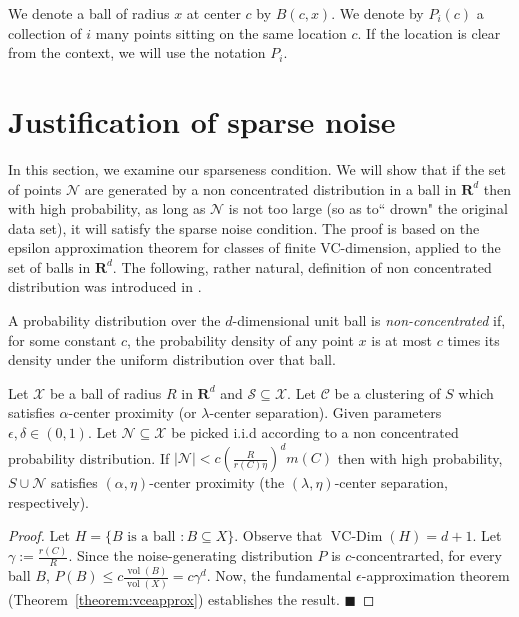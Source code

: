 \documentclass[orivec]{llncs}
\newcommand{\mc}{\mathcal}
\newcommand{\mb}{\mathbf}
\DeclareMathOperator{\vcdim}{VC-Dim}
\DeclareMathOperator{\vol}{vol}
\renewcommand{\qed}{\hfill\ensuremath{\blacksquare}}
\begin{document}
We denote a ball of radius $x$ at center $c$ by $B(c, x)$. We denote by $P_{i}(c)$ a collection of $i$ many points sitting on the same location $c$. If the location is clear from the context, we will use the notation $P_i$.



\section{Justification of sparse noise}
\label{Noise_justify}
In this section, we examine our sparseness condition. We will show that if the set of points $\mc N$ are generated by a non concentrated distribution in a ball in $\mb R^d$ then with high probability, as long as $\mc N$ is not too large (so as to``
drown" the original data set), it will satisfy the sparse noise condition. The proof is based on the epsilon approximation theorem for classes of finite VC-dimension, applied to the set of balls in $\mb R^d$. The following, rather natural, definition of non concentrated distribution was introduced in \cite{balcan2012distributed}.
\begin{definition} 
A probability distribution over the $d$-dimensional unit ball is \emph{non-concentrated} if, for some constant $c$, the probability density of any point $x$ is at most $c$ times its density under the uniform distribution over that ball.
\end{definition}

\begin{theorem}
\label{theorem:sparse}
Let $\mc X$ be a ball of radius $R$ in $\mb R^d$ and $\mc S \subseteq \mc X$. Let $\mc C$ be a clustering of $S$ which satisfies $\alpha$-center proximity (or $\lambda$-center separation). Given parameters $\epsilon, \delta \in (0,1)$. Let $\mc N \subseteq \mc X$ be picked i.i.d according to a non concentrated probability distribution. If $|\mc N| < c  \left( \frac{R}{r(C) \eta} \right) ^d m(C)$
then with high probability, $S \cup \mc N$  satisfies $(\alpha, \eta)$-center proximity (the $(\lambda, \eta)$-center separation, respectively).
\end{theorem}
\begin{proof}
Let $H = \{B \text{ is a ball }: B \subseteq X\}$. Observe that $\vcdim(H) = d+1$. Let $\gamma := \frac{r(C)}{R}$. Since the noise-generating distribution $P$ is $c$-concentrarted, for every ball $B$, $P(B) \leq c \frac{\vol(B)}{\vol(X)} = c\gamma^d$. Now, the fundamental $\epsilon$-approximation theorem (Theorem~\ref{theorem:vceapprox}) establishes the result.
\qed
\end{proof}
\end{document}
